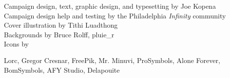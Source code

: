 
\noindent
Campaign design, text, graphic design, and typesetting by Joe Kopena\\
Campaign design help and testing by the Philadelphia \textit{Infinity} community\\
Cover illustration by Tithi Luadthong\\
Backgrounds by Bruce Rolff, pluie\_r\\
Icons by
\begin{minipage}[t]{4in}
Lorc, Gregor Cresnar, FreePik, Mr. Minuvi, ProSymbols, Alone Forever,
BomSymbols, AFY Studio, Delapouite
\end{minipage}
